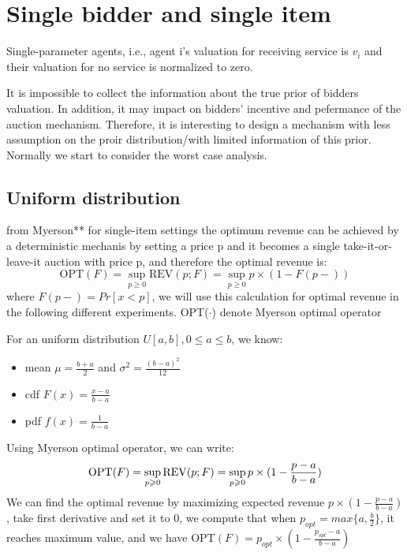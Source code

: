 \chapter{Single bidder and single item}
\label{ch:body of thesis}

Single-parameter agents, i.e., agent i's valuation for receiving service is $v_{i}$ and their valuation for no service is normalized to zero.

It is impossible to collect the information about the true prior of bidders valuation. In addition, it may impact on bidders' incentive and pefermance of the auction mechanism. Therefore, it is interesting to design a mechanism with less assumption on the proir distribution/with limited information of this prior. Normally we start to consider the worst case analysis.


\section{Uniform distribution}
from Myerson** for single-item settings the optimum revenue can be achieved by a deterministic mechanis by setting a price p and it becomes a single take-it-or-leave-it auction with price p, and therefore the optimal revenue is:
\begin{equation}
\text{OPT}(F) = \sup_{p \geqslant 0} \text{REV}(p;F) = \sup_{p \geqslant 0} p \times (1-F(p-)) 
\end{equation}
where $F(p-) = Pr[x<p]$, we will use this calculation for optimal revenue in the following different experiments. OPT($\cdot$) denote Myerson optimal operator


For an uniform distribution $U[a,b], 0\leqslant a\leqslant b$, we know:
\begin{itemize}
	\item mean $\mu = \frac{b+a}{2}$ and $\sigma^{2} = \frac{(b-a)^{2}}{12}$
	\item cdf $F(x) = \frac {x-a}{b-a} $ 
	\item pdf $f(x) = \frac{1}{b-a}$
\end{itemize}

Using Myerson optimal operator, we can write:
\begin{equation}\notag
\text{OPT}(F) = \sup_{p \geqslant 0} \text{REV}(p;F) = \sup_{p \geqslant 0} p \times (1-\frac {p-a}{b-a}) 
\end{equation}
We can find the optimal revenue by maximizing expected revenue $p \times (1-\frac {p-a}{b-a}) $, take first derivative and set it to 0, we compute that when $p_{opt} =max \{a, \frac{b}{2} \}$, it reaches maximum value, and we have $\text{OPT}(F) =p_{opt} \times (1-\frac {p_{opt}-a}{b-a})$ 

